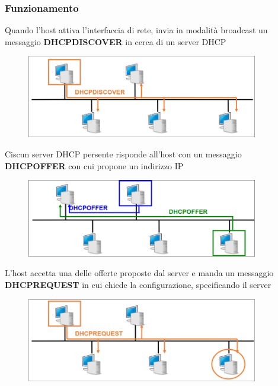 \documentclass{report}
\begin{document}
                \subsubsection{Funzionamento}
                    Quando l'host attiva l'interfaccia di rete, invia in modalità broadcast un messaggio \textbf{DHCPDISCOVER} in cerca di un server DHCP
                    \begin{figure}[H]
                        \includegraphics[width=0.9\textwidth]{2/DHCP1.png}
                    \end{figure}
                    Ciscun server DHCP persente risponde all'host con un messaggio \textbf{DHCPOFFER} con cui propone un indirizzo IP
                    \begin{figure}[H]
                        \includegraphics[width=0.9\textwidth]{2/DHCP2.png}
                    \end{figure}
                    L'host accetta una delle offerte proposte dal server e manda un messaggio \textbf{DHCPREQUEST} in cui chiede la configurazione, specificando il server
                    \begin{figure}[H]
                        \includegraphics[width=0.9\textwidth]{2/DHCP3.png}
                    \end{figure}
\end{document}
